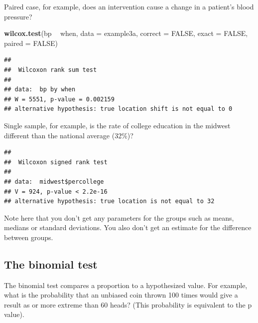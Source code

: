 \documentclass[]{book}
\newenvironment{Shaded}{\begin{snugshade}}{\end{snugshade}}
\newcommand{\DataTypeTok}[1]{\textcolor[rgb]{0.13,0.29,0.53}{#1}}
\newcommand{\DecValTok}[1]{\textcolor[rgb]{0.00,0.00,0.81}{#1}}
\newcommand{\KeywordTok}[1]{\textcolor[rgb]{0.13,0.29,0.53}{\textbf{#1}}}
\newcommand{\NormalTok}[1]{#1}
\newcommand{\OperatorTok}[1]{\textcolor[rgb]{0.81,0.36,0.00}{\textbf{#1}}}
\newcommand{\OtherTok}[1]{\textcolor[rgb]{0.56,0.35,0.01}{#1}}
\newcommand{\StringTok}[1]{\textcolor[rgb]{0.31,0.60,0.02}{#1}}
\begin{document}
Paired case, for example, does an intervention cause a change in a
patient's blood pressure?

\begin{Shaded}
\begin{Highlighting}[]
\KeywordTok{wilcox.test}\NormalTok{(bp }\OperatorTok{~}\StringTok{ }\NormalTok{when, }\DataTypeTok{data =}\NormalTok{ example3a, }\DataTypeTok{correct =} \OtherTok{FALSE}\NormalTok{, }\DataTypeTok{exact =} \OtherTok{FALSE}\NormalTok{, }\DataTypeTok{paired =} \OtherTok{FALSE}\NormalTok{)}
\end{Highlighting}
\end{Shaded}

\begin{verbatim}
## 
##  Wilcoxon rank sum test
## 
## data:  bp by when
## W = 5551, p-value = 0.002159
## alternative hypothesis: true location shift is not equal to 0
\end{verbatim}

Single sample, for example, is the rate of college education in the
midwest different than the national average (32\%)?

\begin{Shaded}
\end{Shaded}

\begin{verbatim}
## 
##  Wilcoxon signed rank test
## 
## data:  midwest$percollege
## V = 924, p-value < 2.2e-16
## alternative hypothesis: true location is not equal to 32
\end{verbatim}

Note here that you don't get any parameters for the groups such as
means, medians or standard deviations. You also don't get an estimate
for the difference between groups.

\hypertarget{the-binomial-test}{%
\subsection{\texorpdfstring{\textbf{The binomial
test}}{The binomial test}}\label{the-binomial-test}}

The binomial test compares a proportion to a hypothesized value. For
example, what is the probability that an unbiased coin thrown 100 times
would give a result as or more extreme than 60 heads? (This probability
is equivalent to the p value).
\end{document}
